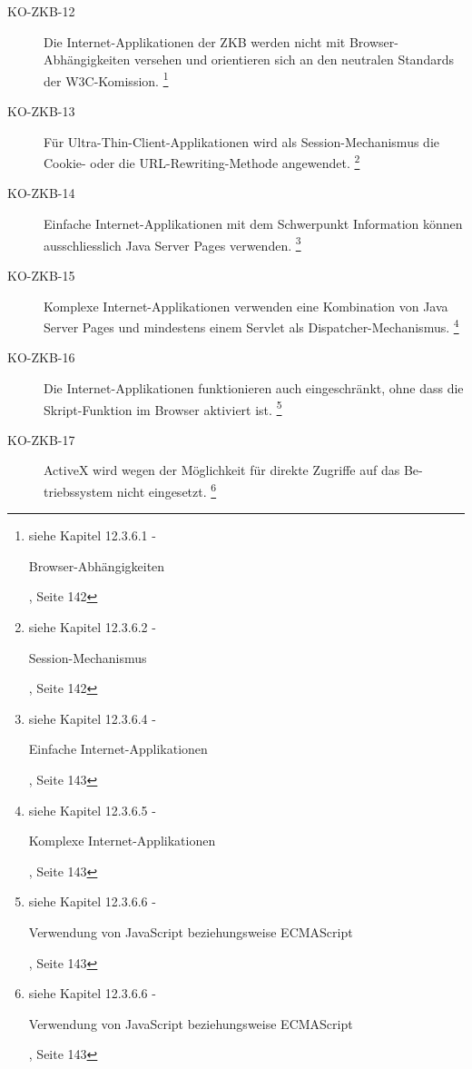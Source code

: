 \documentclass[abstracton, listof=totocnumbered,
bibliography=totocnumbered]{scrreprt}
\begin{document}
\begin{description}
    \item[KO-ZKB-12] Die Internet-Applikationen der ZKB werden nicht mit
    Browser-Abhängigkeiten versehen und orientieren sich an den neutralen
    Standards der W3C-Komission.
    \footnote{siehe Kapitel 12.3.6.1 -
    \begin{itshape}Browser-Abhängigkeiten\end{itshape}, Seite 142}
    
    \item[KO-ZKB-13] Für Ultra-Thin-Client-Applikationen wird als
    Session-Mechanismus die Cookie- oder die URL-Rewriting-Methode angewendet.
    \footnote{siehe Kapitel 12.3.6.2 -
    \begin{itshape}Session-Mechanismus\end{itshape}, Seite 142}
    
    \item[KO-ZKB-14] Einfache Internet-Applikationen mit dem Schwerpunkt
    Information können ausschliesslich Java Server Pages verwenden.
    \footnote{siehe Kapitel 12.3.6.4 -
    \begin{itshape}Einfache Internet-Applikationen\end{itshape}, Seite 143}
    
    \item[KO-ZKB-15] Komplexe Internet-Applikationen verwenden eine Kombination
    von Java Server Pages und mindestens einem Servlet als Dispatcher-Mechanismus.
    \footnote{siehe Kapitel 12.3.6.5 -
    \begin{itshape}Komplexe Internet-Applikationen\end{itshape}, Seite 143}
    
    \item[KO-ZKB-16] Die Internet-Applikationen funktionieren auch
    eingeschränkt, ohne dass die Skript-Funktion im Browser aktiviert ist.
    \footnote{siehe Kapitel 12.3.6.6 -
    \begin{itshape}Verwendung von JavaScript beziehungsweise ECMAScript\end{itshape}, Seite 143}
    
    \item[KO-ZKB-17] ActiveX wird wegen der Möglichkeit für direkte Zugriffe auf
    das Be-triebssystem nicht eingesetzt.
    \footnote{siehe Kapitel 12.3.6.6 -
    \begin{itshape}Verwendung von JavaScript beziehungsweise ECMAScript\end{itshape}, Seite 143}
    

\end{description}
\end{document}
